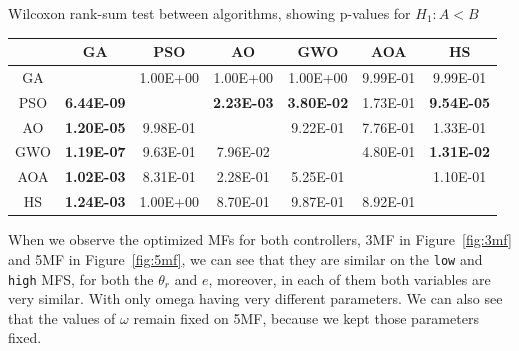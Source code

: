 \documentclass[symmetry,article,submit,moreauthors,pdftex]{Definitions/mdpi}
\begin{document}
\begin{specialtable}[H] 
\small
\centering
\caption{Wilcoxon rank-sum test between algorithms, showing p-values for $H_1:A<B$}\label{tab:wilcoxon} 
\begin{tabular}{ccccccc}
\toprule 
    & GA       & PSO      & AO       & GWO      & AOA      & HS       \\
\midrule
GA  &          & 1.00E+00 & 1.00E+00 & 1.00E+00 & 9.99E-01 & 9.99E-01 \\
\midrule
PSO & \textbf{6.44E-09} &          & \textbf{2.23E-03} & \textbf{3.80E-02} & 1.73E-01 & \textbf{9.54E-05} \\
\midrule
AO  & \textbf{1.20E-05} & 9.98E-01 &          & 9.22E-01 & 7.76E-01 & 1.33E-01 \\
\midrule
GWO & \textbf{1.19E-07} & 9.63E-01 & 7.96E-02 &          & 4.80E-01 & \textbf{1.31E-02} \\
\midrule
AOA & \textbf{1.02E-03} & 8.31E-01 & 2.28E-01 & 5.25E-01 &          & 1.10E-01 \\
\midrule
HS  & \textbf{1.24E-03} & 1.00E+00 & 8.70E-01 & 9.87E-01 & 8.92E-01 &          \\
\bottomrule
\end{tabular}
\end{specialtable}

When we observe the optimized MFs for both controllers, 3MF in
Figure~\ref{fig:3mf} and 5MF in Figure~\ref{fig:5mf}, we can see that they are
similar on the \texttt{low} and \texttt{high} MFS, for both the $\theta_r$ and
$e$, moreover, in each of them both variables are very similar. With only omega
having very different parameters.  We can also see that the values of $\omega$
remain fixed on 5MF, because we kept those parameters fixed.
\end{document}
